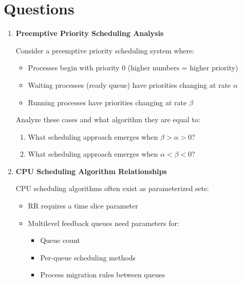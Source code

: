\documentclass[12pt]{article}
\begin{document}
\section{Questions}
\begin{enumerate}[leftmargin=*]

    \item \textbf{Preemptive Priority Scheduling Analysis}
    
    Consider a preemptive priority scheduling system where:
    \begin{itemize}
        \item Processes begin with priority 0 (higher numbers = higher priority)
        \item Waiting processes (ready queue) have priorities changing at rate $\alpha$
        \item Running processes have priorities changing at rate $\beta$
    \end{itemize}
    
    Analyze these cases and what algorithm they are equal to:
    \begin{enumerate}[label=(\alph*)]
        \item What scheduling approach emerges when $\beta > \alpha > 0$?
        \item What scheduling approach emerges when $\alpha < \beta < 0$?
    \end{enumerate}
    

    \item \textbf{CPU Scheduling Algorithm Relationships}
    
    CPU scheduling algorithms often exist as parameterized sets:
    \begin{itemize}
        \item RR requires a time slice parameter
        \item Multilevel feedback queues need parameters for:
        \begin{itemize}
            \item Queue count
            \item Per-queue scheduling methods
            \item Process migration rules between queues
        \end{itemize}
    \end{itemize}
    

\end{enumerate}
\end{document}
